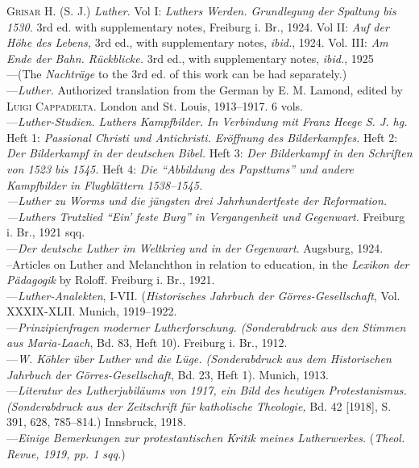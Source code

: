 \textsc{Grisar H.} (S. J.) \textit{Luther.} Vol I: \textit{Luthers Werden. Grundlegung der Spaltung
bis 1530.} 3rd ed. with supplementary notes, Freiburg i. Br., 1924. Vol II:
\textit{Auf der Höhe des Lebens,} 3rd ed., with supplementary notes, \textit{ibid.}, 1924.
Vol. III: \textit{Am Ende der Bahn. Rückblicke.} 3rd ed., with supplementary
notes, \textit{ibid.}, 1925 \\
---(The \textit{Nachträge} to the 3rd ed. of this work can be
had separately.) \\
---\textit{Luther.} Authorized translation from the German by E. M. Lamond,
edited by \textsc{Luigi Cappadelta}. London and St. Louis, 1913--1917. 6 vols. \\
---\textit{Luther-Studien. Luthers Kampfbilder. In Verbindung mit Franz Heege
S. J. hg.} \\
Heft 1: \textit{Passional Christi und Antichristi. Eröffnung des Bilderkampfes.}
Heft 2: \textit{Der Bilderkampf in der deutschen Bibel.}
Heft 3: \textit{Der Bilderkampf in den Schriften von 1523 bis 1545.}
Heft 4: \textit{Die “Abbildung des Papsttums” und andere Kampfbilder in Flugblättern 1538--1545. \\
---Luther zu Worms und die jüngsten drei Jahrhundertfeste der Reformation. \\
---Luthers Trutzlied “Ein’ feste Burg” in Vergangenheit und Gegenwart.}
Freiburg i. Br., 1921 sqq. \\
---\textit{Der deutsche Luther im Weltkrieg und in der Gegenwart}. Augsburg,
1924. \\
--Articles on Luther and Melanchthon in relation to education, in the
\textit{Lexikon der Pädagogik} by Roloff. Freiburg i. Br., 1921. \\
---\textit{Luther-Analekten}, I-VII. (\textit{Historisches Jahrbuch der Görres-Gesellschaft},
Vol. XXXIX-XLII. Munich, 1919--1922. \\
---\textit{Prinzipienfragen moderner Lutherforschung. (Sonderabdruck aus den
Stimmen aus Maria-Laach}, Bd. 83, Heft 10). Freiburg i. Br., 1912. \\
---\textit{W. Köhler über Luther und die Lüge. (Sonderabdruck aus dem Historischen
Jahrbuch der Görres-Gesellschaft}, Bd. 23, Heft 1). Munich,
1913. \\
---\textit{Literatur des Lutherjubiläums von 1917, ein Bild des heutigen Protestanismus.
(Sonderabdruck aus der Zeitschrift für katholische Theologie,}
Bd. 42 [1918], S. 391, 628, 785--814.) Innsbruck, 1918. \\
---\textit{Einige Bemerkungen zur protestantischen Kritik meines Lutherwerkes.}
(\textit{Theol. Revue, 1919, pp. 1 sqq.}) \\

